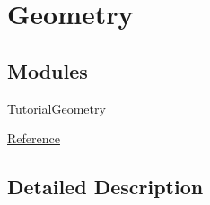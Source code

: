 \hypertarget{group___geometry__chapter}{}\section{Geometry}
\label{group___geometry__chapter}
\subsection*{Modules}
\begin{DoxyCompactItemize}
\item 
\hyperlink{group___tutorial_geometry}{Tutorial\+Geometry}
\item 
\hyperlink{group___geometry___reference}{Reference}
\end{DoxyCompactItemize}


\subsection{Detailed Description}
